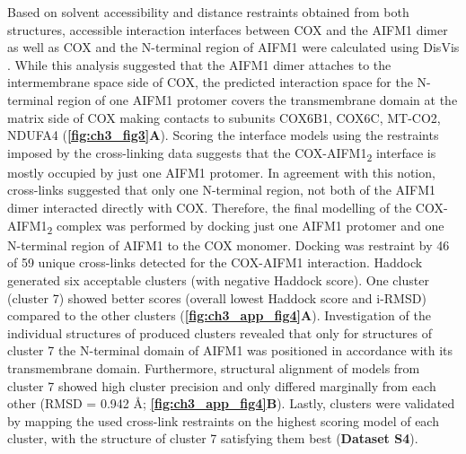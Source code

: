 Based on solvent accessibility and distance restraints obtained from both structures, accessible interaction interfaces between COX and the AIFM1 dimer as well as COX and the N-terminal region of AIFM1 were calculated using DisVis \cite{RN44}. While this analysis suggested that the AIFM1 dimer attaches to the intermembrane space side of COX, the predicted interaction space for the N-terminal region of one AIFM1 protomer covers the transmembrane domain at the matrix side of COX making contacts to subunits COX6B1, COX6C, MT-CO2, NDUFA4 (\textbf{\autoref{fig:ch3_fig3}A}). Scoring the interface models using the restraints imposed by the cross-linking data suggests that the COX-AIFM1\textsubscript{2} interface is mostly occupied by just one AIFM1 protomer. In agreement with this notion, cross-links suggested that only one N-terminal region, not both of the AIFM1 dimer interacted directly with COX. Therefore, the final modelling of the COX-AIFM1\textsubscript{2} complex was performed by docking just one AIFM1 protomer and one N-terminal region of AIFM1 to the COX monomer. Docking was restraint by 46 of 59 unique cross-links detected for the COX-AIFM1 interaction. Haddock \cite{RN45} generated six acceptable clusters (with negative Haddock score). One cluster (cluster 7) showed better scores (overall lowest Haddock score and i-RMSD) compared to the other clusters (\textbf{\autoref{fig:ch3_app_fig4}A}). Investigation of the individual structures of produced clusters revealed that only for structures of cluster 7 the N-terminal domain of AIFM1 was positioned in accordance with its transmembrane domain. Furthermore, structural alignment of models from cluster 7 showed high cluster precision and only differed marginally from each other (RMSD = 0.942 Å; \textbf{\autoref{fig:ch3_app_fig4}B}). Lastly, clusters were validated by mapping the used cross-link restraints on the highest scoring model of each cluster, with the structure of cluster 7 satisfying them best (\textbf{Dataset S4}).
